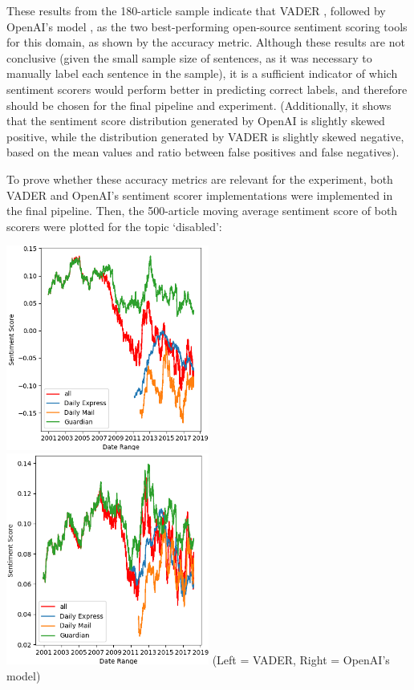 \documentclass{report}
\begin{document}
These results from the 180-article sample indicate that VADER \cite{VADER}, followed by OpenAI's model \cite{OpenAI}, as the two best-performing open-source sentiment scoring tools for this domain, as shown by the accuracy metric.
Although these results are not conclusive (given the small sample size of sentences, as it was necessary to manually label each sentence in the sample), it is a sufficient indicator of which sentiment scorers would perform better in predicting correct labels, and therefore should be chosen for the final pipeline and experiment.
(Additionally, it shows that the sentiment score distribution generated by OpenAI is slightly skewed positive, while the distribution generated by VADER is slightly skewed negative, based on the mean values and ratio between false positives and false negatives).

To prove whether these accuracy metrics are relevant for the experiment, both VADER and OpenAI's sentiment scorer implementations were implemented in the final pipeline.
Then, the 500-article moving average sentiment score of both scorers were plotted for the topic `disabled':

\noindent
\includegraphics[width=0.5\textwidth]{vader.png}
\includegraphics[width=0.5\textwidth]{openai.png}
(Left = VADER, Right = OpenAI's model)
\vspace{0.5em}
\end{document}
